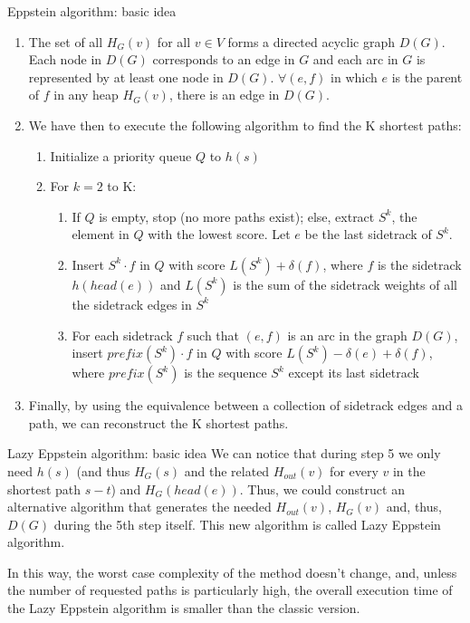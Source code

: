 \begin{frame}[allowframebreaks]{Eppstein algorithm: basic idea}
\begin{enumerate}
        \framebreak
        
        \item The set of all $H_G(v)$ for all $v \in V$ forms a directed acyclic graph $D(G)$. Each node in $D(G)$ corresponds to an edge in $G$ and each arc in $G$ is represented by at least one node in $D(G)$. $\forall (e,f)$ in which $e$ is the parent of $f$ in any heap $H_G(v)$, there is an edge in $D(G)$.
        \item We have then to execute the following algorithm to find the K shortest paths:
        \begin{enumerate}
            \item Initialize a priority queue $Q$ to ${h(s)}$
            \item For $k = 2$ to K:
            \begin{enumerate}
                \item If $Q$ is empty, stop (no more paths exist); else, extract $S^k$, the element in $Q$ with the lowest score. Let $e$ be the last sidetrack of $S^k$.
                \item Insert $S^k \cdot f$ in $Q$ with score $L(S^k) + \delta(f)$, where $f$ is the sidetrack $h(head(e))$ and $L(S^k)$ is the sum of the sidetrack weights of all the sidetrack edges in $S^k$
                \item For each sidetrack $f$ such that $(e,f)$ is an arc in the graph $D(G)$, insert $prefix(S^k) \cdot f$ in $Q$ with score $L(S^k)-\delta(e)+\delta(f)$, where $prefix(S^k)$ is the sequence $S^k$ except its last sidetrack
            \end{enumerate}
        \end{enumerate}
        \item Finally, by using the equivalence between a collection of sidetrack edges and a path, we can reconstruct the K shortest paths.
    \end{enumerate}
\end{frame}

\begin{frame}{Lazy Eppstein algorithm: basic idea}
    We can notice that during step 5 we only need $h(s)$ (and thus $H_G(s)$ and the related $H_{out}(v)$ for every $v$ in the shortest path $s-t$) and $H_G(head(e))$. Thus, we could construct an alternative algorithm that generates the needed $H_{out}(v)$, $H_G(v)$ and, thus, $D(G)$ during the 5th step itself. This new algorithm is called Lazy Eppstein algorithm.

    
    In this way, the worst case complexity of the method doesn't change, and, unless the number of requested paths is particularly high, the overall execution time of the Lazy Eppstein algorithm is smaller than the classic version.
\end{frame}
